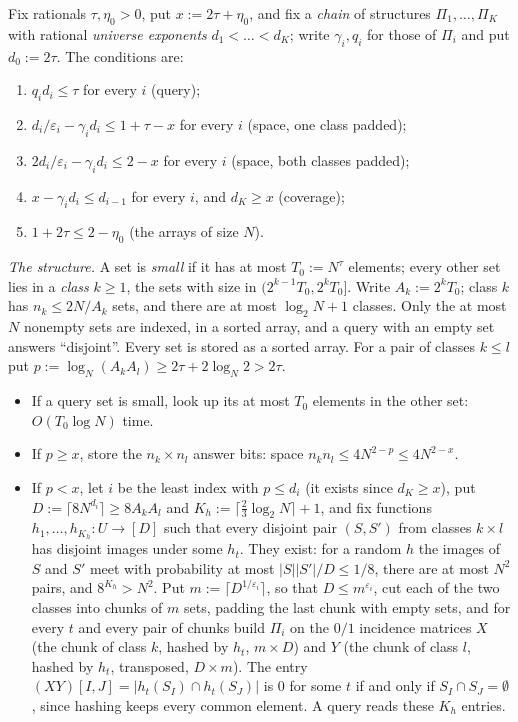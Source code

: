 \documentclass[11pt]{article}
\theoremstyle{definition}
\theoremstyle{remark}
\begin{document}
Fix rationals $\tau,\eta_0>0$, put $x:=2\tau+\eta_0$, and fix a \emph{chain} of structures $\Pi_1,\dots,\Pi_K$ with rational \emph{universe exponents} $d_1<\dots<d_K$; write $\gamma_i,q_i$ for those of $\Pi_i$ and put $d_0:=2\tau$. The conditions are:
\begin{enumerate}[label=(\Alph*),nosep]
\item[(Q)] $q_id_i\le\tau$ for every $i$ (query);
\item[(C2)] $d_i/\varepsilon_i-\gamma_id_i\le1+\tau-x$ for every $i$ (space, one class padded);
\item[(C3)] $2d_i/\varepsilon_i-\gamma_id_i\le2-x$ for every $i$ (space, both classes padded);
\item[(V)] $x-\gamma_id_i\le d_{i-1}$ for every $i$, and $d_K\ge x$ (coverage);
\item[(S)] $1+2\tau\le2-\eta_0$ (the arrays of size $N$).
\end{enumerate}

\emph{The structure.} A set is \emph{small} if it has at most $T_0:=N^\tau$ elements; every other set lies in a \emph{class} $k\ge1$, the sets with size in $(2^{k-1}T_0,2^kT_0]$. Write $A_k:=2^kT_0$; class $k$ has $n_k\le2N/A_k$ sets, and there are at most $\log_2N+1$ classes. Only the at most $N$ nonempty sets are indexed, in a sorted array, and a query with an empty set answers ``disjoint''. Every set is stored as a sorted array. For a pair of classes $k\le l$ put $p:=\log_N(A_kA_l)\ge2\tau+2\log_N2>2\tau$.
\begin{itemize}[nosep]
\item If a query set is small, look up its at most $T_0$ elements in the other set: $O(T_0\log N)$ time.
\item If $p\ge x$, store the $n_k\times n_l$ answer bits: space $n_kn_l\le4N^{2-p}\le4N^{2-x}$.
\item If $p<x$, let $i$ be the least index with $p\le d_i$ (it exists since $d_K\ge x$), put $D:=\lceil8N^{d_i}\rceil\ge8A_kA_l$ and $K_h:=\lceil\frac23\log_2N\rceil+1$, and fix functions $h_1,\dots,h_{K_h}\colon U\to[D]$ such that every disjoint pair $(S,S')$ from classes $k\times l$ has disjoint images under some $h_t$. They exist: for a random $h$ the images of $S$ and $S'$ meet with probability at most $|S||S'|/D\le1/8$, there are at most $N^2$ pairs, and $8^{K_h}>N^2$. Put $m:=\lceil D^{1/\varepsilon_i}\rceil$, so that $D\le m^{\varepsilon_i}$, cut each of the two classes into chunks of $m$ sets, padding the last chunk with empty sets, and for every $t$ and every pair of chunks build $\Pi_i$ on the $0/1$ incidence matrices $X$ (the chunk of class $k$, hashed by $h_t$, $m\times D$) and $Y$ (the chunk of class $l$, hashed by $h_t$, transposed, $D\times m$). The entry $(XY)[I,J]=|h_t(S_I)\cap h_t(S_J)|$ is $0$ for some $t$ if and only if $S_I\cap S_J=\emptyset$, since hashing keeps every common element. A query reads these $K_h$ entries.
\end{itemize}
\end{document}
